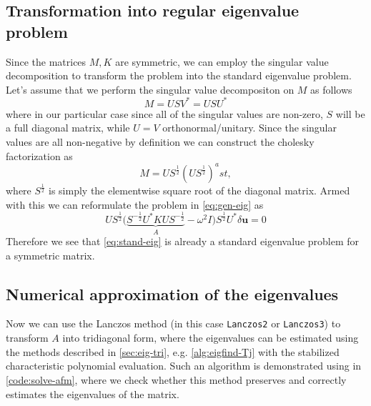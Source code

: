 \documentclass{article}
\begin{document}
\subsection{Transformation into regular eigenvalue problem}
Since the matrices $M, K$ are symmetric, we can employ the singular value decomposition to transform the problem into the standard eigenvalue problem. Let's assume that we perform the singular value decompositon on $M$ as follows
\begin{equation}
	M = U S V^\ast = U S U^\ast
\end{equation}
where in our particular case since all of the singular values are non-zero, $S$ will be a full diagonal matrix, while $U=V$ orthonormal/unitary.
Since the singular values are all non-negative by definition we can construct the cholesky factorization as 
\begin{equation}
	M = U S ^{\frac{1}{2}} \left(U S ^{\frac{1}{2}}\right)^ast,
\end{equation}
where $S ^{\frac{1}{2}}$ is simply the elementwise square root of the diagonal matrix. Armed with this we can reformulate the problem in \autoref{eq:gen-eig} as 
\begin{equation}\label{eq:stand-eig}
	U S^{\frac{1}{2}} \bigl( \underbrace{S^{-\frac{1}{2}} U^\ast K U S^{-\frac{1}{2}}}_{A} - \omega^2 I\bigr)S^{\frac{1}{2}} U^\ast \delta \mathbf{u} = 0 
\end{equation}
Therefore we see that \autoref{eq:stand-eig} is already a standard eigenvalue problem for a symmetric matrix.

\subsection{Numerical approximation of the eigenvalues}
Now we can use the Lanczos method (in this case \texttt{Lanczos2} or \texttt{Lanczos3}) to transform $A$ into tridiagonal form, where the eigenvalues can be estimated using the methods described in \autoref{sec:eig-tri}, e.g. \autoref{alg:eigfind-Tj} with the stabilized characteristic polynomial evaluation. Such an algorithm is demonstrated using in \autoref{code:solve-afm}, where we check whether this method preserves and correctly estimates the eigenvalues of the matrix. 
\end{document}
